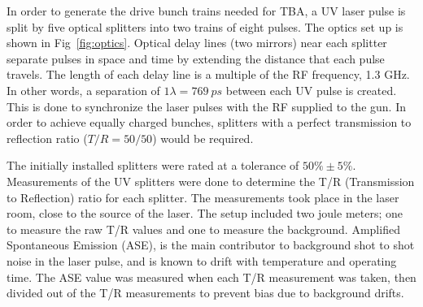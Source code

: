 In order to generate the drive bunch trains needed for TBA, a UV laser pulse is split 
by five optical splitters into two trains of eight pulses. 
The optics set up is shown in Fig~\ref{fig:optics}. Optical delay lines (two mirrors) near each splitter 
separate pulses in space and time by extending the distance that each pulse travels. 
The length of each delay line is a multiple of the RF frequency, 1.3 GHz. 
In other words, a separation of $1\lambda=\SI{769}{ps}$ between each UV pulse is created. 
This is done to synchronize the laser pulses with the RF supplied to the gun.
In order to achieve equally charged bunches, splitters with a perfect transmission 
to reflection ratio ($T/R = 50/50$) would be required.

The initially installed splitters were rated at a tolerance of $50\%\pm5\%$.
Measurements of the UV splitters were done to determine the T/R (Transmission to Reflection) ratio for 
each splitter. The measurements took place in the laser room, close to the source of the laser.
The setup included two joule meters; one to measure the raw T/R values and one to measure 
the background. Amplified Spontaneous Emission (ASE), 
is the main contributor to background shot to shot noise in the laser pulse,
and is known to drift with temperature and operating time. 
The ASE value was measured when each T/R measurement was taken, then divided out of the T/R 
measurements to prevent bias due to background drifts. 

